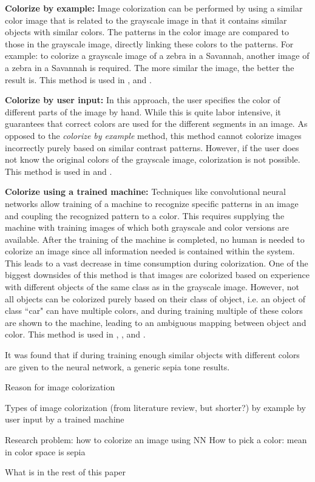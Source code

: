 \textbf{Colorize by example:} Image colorization can be performed by using a similar color image that is related to the grayscale image in that it contains similar objects with similar colors. The patterns in the color image are compared to those in the grayscale image, directly linking these colors to the patterns. For example: to colorize a grayscale image of a zebra in a Savannah, another image of a zebra in a Savannah is required. The more similar the image, the better the result is. This method is used in \cite{Charpiat}, \cite{Gupta} and \cite{Zheng}.

\textbf{Colorize by user input:} In this approach, the user specifies the color of different parts of the image by hand. While this is quite labor intensive, it guarantees that correct colors are used for the different segments in an image. As opposed to the \textit{colorize by example} method, this method cannot colorize images incorrectly purely based on similar contrast patterns. However, if the user does not know the original colors of the grayscale image, colorization is not possible. This method is used in \cite{Horiuchi} and \cite{Levin}.

\textbf{Colorize using a trained machine:} Techniques like convolutional neural networks allow training of a machine to recognize specific patterns in an image and coupling the recognized pattern to a color. This requires supplying the machine with training images of which both grayscale and color versions are available. After the training of the machine is completed, no human is needed to colorize an image since all information needed is contained within the system. This leads to a vast decrease in time consumption during colorization. One of the biggest downsides of this method is that images are colorized based on experience with different objects of the same class as in the grayscale image. However, not all objects can be colorized purely based on their class of object, i.e. an object of class ``car" can have multiple colors, and during training multiple of these colors are shown to the machine, leading to an ambiguous mapping between object and color. This method is used in \cite{Cheng}, \cite{Ho}, \cite{Krizhevsky} and \cite{Dahl}.


It was found that if during training enough similar objects with different colors are given to the neural network, a generic sepia tone results. 



Reason for image colorization
	
	
	
Types of image colorization (from literature review, but shorter?)
	by example
	by user input
	by a trained machine
	
	
	
Research problem: 
	how to colorize an image using NN
	How to pick a color: mean in color space is sepia
	
	
	
What is in the rest of this paper
	
	
	
	




